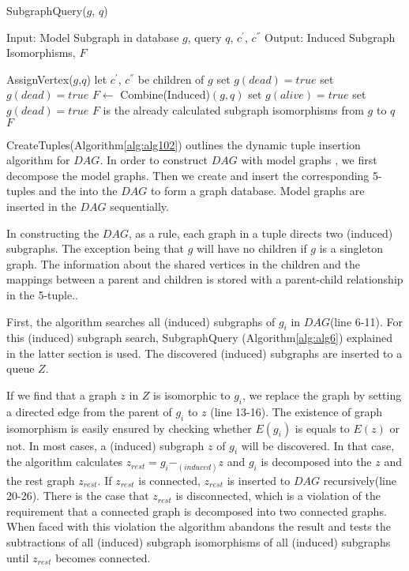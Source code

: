 \begin{algorithm}
\caption{SubgraphQuery($g$, $q$)}
\label{alg:alg106}
\begin{algorithmic}
\STATE Input: Model Subgraph in database  $g$, query $q$, $c^{'}$, $c^{''}$
\STATE Output: Induced Subgraph Isomorphisms, $F$
\end{algorithmic}
\begin{algorithmic}[1]
        \STATE AssignVertex($g$,$q$)
      \ELSE 
         \STATE let $c^{'}$, $c^{''}$ be children of $g$
          \STATE set $g(dead)=true$
			\STATE set $g(dead)=true$
		\ELSE
			\STATE $F \leftarrow$ Combine(Induced)$(g,q)$
		\ENDIF
	\ENDIF
		\STATE set $g(alive)=true$
	\ELSE
		\STATE set  $g(dead)=true$
	\ENDIF
\ELSE
	\STATE $F$ is the already calculated subgraph isomorphisms from $g$ to $q$
\ENDIF
\RETURN $F$
          
\end{algorithmic}
\end{algorithm}


CreateTuples(Algorithm\ref{alg:alg102}) outlines the dynamic tuple insertion algorithm for $DAG$. In order to construct $DAG$ with model graphs , we first decompose the model graphs. Then we create and insert the corresponding 5-tuples and the into the $DAG$ to form a graph database. Model graphs are inserted in the $DAG$ sequentially.

In constructing the $DAG$, as a rule, each graph in a tuple directs two (induced) subgraphs. The exception being that $g$ will have no children if $g$ is a singleton graph. The information about the shared vertices in the children and the mappings between a parent and children is  stored with a parent-child relationship in the 5-tuple..

First, the algorithm searches all (induced) subgraphs of $g_i$ in $DAG$(line 6-11). For this (induced) subgraph search, SubgraphQuery (Algorithm\ref{alg:alg6}) explained in the latter section is used. The discovered (induced) subgraphs are inserted to a queue $Z$.

If we find that a graph $z$ in $Z$ is isomorphic to $g_i$, we replace the graph by setting a directed edge from the parent of $g_i$ to $z$ (line 13-16).
The existence of graph isomorphism is easily ensured by checking whether $E(g_i)$ is equals to $E(z)$ or not. In most cases, a (induced) subgraph $z$ of $g_i$ will be discovered. In that case, the algorithm calculates $z_{rest} = g_i -_{(induced)} z$ and $g_i$ is decomposed into the $z$ and the rest graph $z_{rest}$.
If $z_{rest}$ is connected, $z_{rest}$ is inserted to $DAG$ recursively(line 20-26).
There is the case that $z_{rest}$ is disconnected, which is a violation of the requirement that a connected graph is decomposed into two connected graphs. When faced with this violation the algorithm abandons the result and tests the subtractions of all (induced) subgraph isomorphisms of all (induced) subgraphs until $z_{rest}$ becomes connected.

